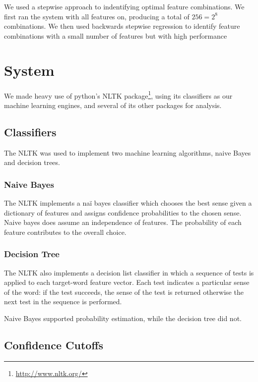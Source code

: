 \documentclass{article}
\begin{document}
We used a \ward stepwise approach to indentifying optimal feature combinations.
We first ran the system with all features on, producing a total of $256=2^8$
combinations.  We then used backwards stepwise regression to identify feature
combinations with a small number of features but with high performance

\section{System}

We made heavy use of python's NLTK
package\footnote{\url{http://www.nltk.org/}}, using its classifiers as our
machine learning engines, and several of its other packages for analysis.

\subsection{Classifiers}

The NLTK was used to implement two machine learning algorithms, naive Bayes and
decision trees.  

\subsubsection{Naive Bayes}

The NLTK implements a naï bayes classifier which chooses the best sense given a
dictionary of features and assigns confidence probabilities to the chosen
sense. Naive bayes does assume an independence of features. The probability of
each feature contributes to the overall choice.

\subsubsection{Decision Tree}

The NLTK also implements a decision list classifier in which a sequence of
tests is applied to each target-word feature vector. Each test indicates a
particular sense of the word: if the test succeeds, the sense of the test is
returned otherwise the next test in the sequence is performed.

Naive Bayes supported probability estimation, while the decision tree did not.

\subsection{Confidence Cutoffs}
\end{document}
